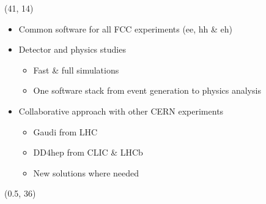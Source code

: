 \documentclass[final,xcolor={dvipsnames,svgnames,x11names,table}]{beamer}
\begin{document}
\begin{frame}
\begin{textblock}{40}
\begin{tcolorbox}[title=The Future Circular Collider Experiment (FCC)]
  \end{tcolorbox}
\end{textblock}

\begin{textblock}{40}(41, 14)
  \begin{tcolorbox}[title=FCCSW: Physics and Detector simulations with FCCSW]

  \begin{itemize}
    \item Common software for all FCC experiments (ee, hh \& eh)
    \item Detector and physics studies
      \begin{itemize}
        \item Fast \& full simulations
        \item One software stack from event generation to physics analysis
      \end{itemize}
    \item Collaborative approach with other CERN experiments
      \begin{itemize}
        \item Gaudi from LHC
        \item DD4hep from CLIC \& LHCb
        \item New solutions where needed
      \end{itemize}

  \end{itemize}



  \vspace{1cm}

  \centering
  \end{tcolorbox}
\end{textblock}

\begin{textblock}{40}(0.5, 36)
  \begin{tcolorbox}[title=The IDEA detector concept for FCC-ee]


\end{tcolorbox}
\end{textblock}
\end{frame}
\end{document}
